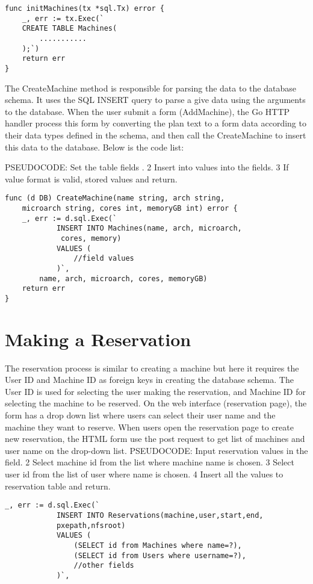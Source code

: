 \begin{lstlisting}[caption=Creating Database for machine, label=Initializing database]
func initMachines(tx *sql.Tx) error {
	_, err := tx.Exec(`
	CREATE TABLE Machines(
		...........
	);`)
	return err
}
\end{lstlisting}

The CreateMachine method is responsible for parsing the data to the database schema. It uses the SQL INSERT query to parse a give data using the arguments to the database. When the user submit a form (AddMachine), the Go HTTP handler process this form by converting the plan text to a form data according to their data types defined in the schema, and then call the CreateMachine to insert this data to the database. Below is the code list:

PSEUDOCODE: Set the table fields .
2 Insert into values into the fields.
3 If value format is valid, stored values and return.

\begin{lstlisting}[caption=Adding machines details, label=Adding machine]
func (d DB) CreateMachine(name string, arch string,
	microarch string, cores int, memoryGB int) error {
	_, err := d.sql.Exec(`
			INSERT INTO Machines(name, arch, microarch,
			 cores, memory)
			VALUES (
				//field values
			)`,
		name, arch, microarch, cores, memoryGB)
	return err
}
\end{lstlisting}

\section*{Making a Reservation}
The reservation process is similar to creating a machine but here it requires the User ID and Machine ID as foreign keys in creating the database schema. The User ID is used for selecting the user making the reservation, and Machine ID for selecting the machine to be reserved. On the web interface (reservation page), the form has a drop down list where users can select their user name and the machine they want to reserve. When users open the reservation page to create new reservation, the HTML form use the post request to get list of machines and user name on the drop-down list.
PSEUDOCODE: Input reservation values in the field.
2 Select machine id from the list where machine name is chosen.
3 Select user id from the list of user where name is chosen.
4 Insert all the values to reservation table and return.
\begin{lstlisting}[caption=Storing Reservation details, label=Adding reservation]
	_, err := d.sql.Exec(`
			INSERT INTO Reservations(machine,user,start,end,
			pxepath,nfsroot)
			VALUES (
				(SELECT id from Machines where name=?),
				(SELECT id from Users where username=?),
				//other fields
			)`,
\end{lstlisting}

